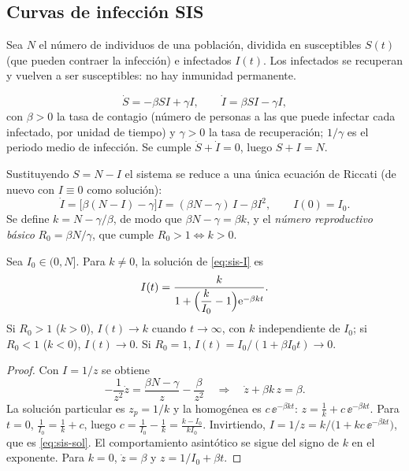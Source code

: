 \subsection{Curvas de infección SIS}

Sea $N$ el número de individuos de una población, dividida en susceptibles $S(t)$ (que pueden contraer la infección) e infectados $I(t)$. Los infectados se recuperan y vuelven a ser susceptibles: no hay inmunidad permanente.

\begin{modelo}[SIS]
\begin{equation}
  \dot S = -\beta SI + \gamma I, \qquad \dot I = \beta SI - \gamma I,
  \label{eq:sis}
\end{equation}
con $\beta>0$ la tasa de contagio (número de personas a las que puede infectar cada infectado, por unidad de tiempo) y $\gamma>0$ la tasa de recuperación; $1/\gamma$ es el periodo medio de infección. Se cumple $\dot S+\dot I=0$, luego $S+I=N$.
\end{modelo}

Sustituyendo $S=N-I$ el sistema se reduce a una única ecuación de Riccati (de nuevo con $I\equiv 0$ como solución):
\begin{equation}
  \dot I = \bigl[\beta(N-I)-\gamma\bigr]I = (\beta N-\gamma)\,I - \beta I^2, \qquad I(0)=I_0.
  \label{eq:sis-I}
\end{equation}
Se define $k = N-\gamma/\beta$, de modo que $\beta N-\gamma=\beta k$, y el \emph{número reproductivo básico} $R_0=\beta N/\gamma$, que cumple $R_0>1\iff k>0$.

\begin{theorem}\label{thm:sis}
Sea $I_0\in(0,N]$. Para $k\neq 0$, la solución de \eqref{eq:sis-I} es
\begin{equation}
  I(t)=\frac{k}{1+\Bigl(\dfrac{k}{I_0}-1\Bigr)\mathrm{e}^{-\beta k t}}.
  \label{eq:sis-sol}
\end{equation}
Si $R_0>1$ ($k>0$), $I(t)\to k$ cuando $t\to\infty$, con $k$ independiente de $I_0$; si $R_0<1$ ($k<0$), $I(t)\to 0$. Si $R_0=1$, $I(t)=I_0/(1+\beta I_0 t)\to 0$.
\end{theorem}

\begin{proof}
Con $I=1/z$ se obtiene
\[
  -\frac{1}{z^2}\dot z=\frac{\beta N-\gamma}{z}-\frac{\beta}{z^2}
  \quad\Longrightarrow\quad
  \dot z+\beta k\,z=\beta .
\]
La solución particular es $z_p=1/k$ y la homogénea es $c\,\ee^{-\beta kt}$: $z=\tfrac1k+c\,\ee^{-\beta kt}$. Para $t=0$, $\tfrac1{I_0}=\tfrac1k+c$, luego $c=\tfrac1{I_0}-\tfrac1k=\tfrac{k-I_0}{kI_0}$. Invirtiendo, $I=1/z=k/\bigl(1+kc\,\ee^{-\beta kt}\bigr)$, que es \eqref{eq:sis-sol}. El comportamiento asintótico se sigue del signo de $k$ en el exponente. Para $k=0$, $\dot z=\beta$ y $z=1/I_0+\beta t$.
\end{proof}

